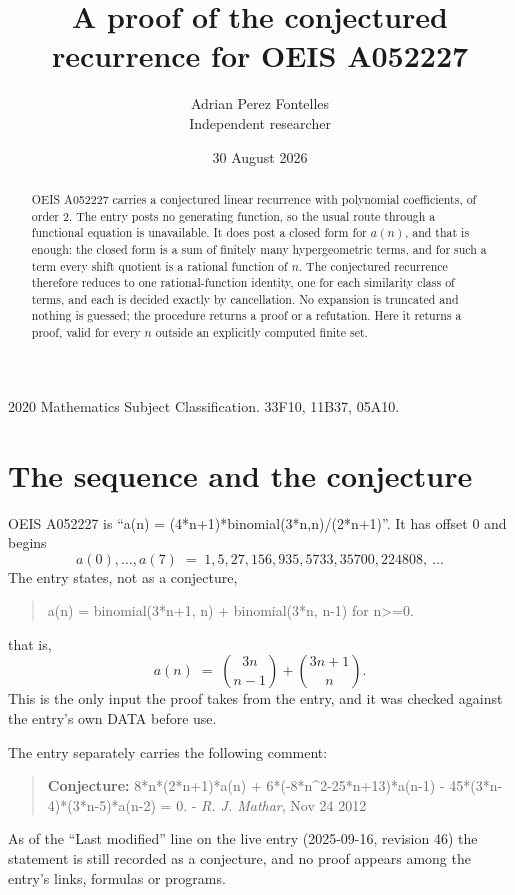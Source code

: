 \documentclass[11pt,a4paper]{article}
\title{A proof of the conjectured recurrence for OEIS A052227}
\author{Adrian Perez Fontelles\\ \small Independent researcher}
\date{30 August 2026}
\theoremstyle{plain}
\theoremstyle{definition}
\begin{document}
\maketitle

\begin{abstract}
OEIS A052227 carries a conjectured linear recurrence with polynomial coefficients, of
order 2. The entry posts no generating function, so the usual route through a
functional equation is unavailable. It does post a closed form for $a(n)$, and that is
enough: the closed form is a sum of finitely many hypergeometric terms, and for such a
term every shift quotient is a rational function of $n$. The conjectured recurrence
therefore reduces to one rational-function identity, one for each similarity
class of terms, and each is decided exactly by cancellation. No expansion is truncated and
nothing is guessed; the procedure returns a proof or a refutation. Here it returns a proof,
valid for every $n$ outside an explicitly computed finite set.
\end{abstract}

\noindent\small 2020 Mathematics Subject Classification. 33F10, 11B37, 05A10.\normalsize

\section{The sequence and the conjecture}

OEIS A052227 is ``a(n) = (4*n+1)*binomial(3*n,n)/(2*n+1)''. It has offset $0$ and begins
\[
a(0),\dots,a(7)\;=\;1, 5, 27, 156, 935, 5733, 35700, 224808,\ \dots
\]
The entry states, not as a conjecture,
\begin{quote}\small
a(n) = binomial(3*n+1, n) + binomial(3*n, n-1) for n>=0.
\end{quote}
that is,
\begin{equation}\label{eq:cf}
a(n)\;=\;{\binom{3 n}{n - 1}} + {\binom{3 n + 1}{n}} .
\end{equation}
This is the only input the proof takes from the entry, and it was checked against the
entry's own DATA before use.

The entry separately carries the following comment:
\begin{quote}\small
\textbf{Conjecture:} 8*n*(2*n+1)*a(n) + 6*(-8*n\^{}2-25*n+13)*a(n-1) - 45*(3*n-4)*(3*n-5)*a(n-2) = 0. - \emph{R. J. Mathar}, Nov 24 2012
\end{quote}
As of the ``Last modified'' line on the live entry (2025-09-16, revision 46) the
statement is still recorded as a conjecture, and no proof appears among the entry's links,
formulas or programs.
\end{document}
